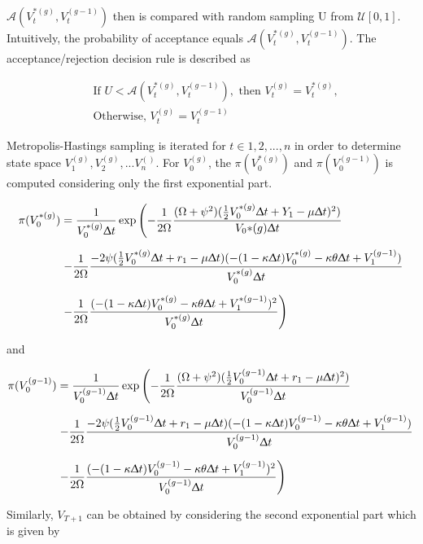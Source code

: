\documentclass[12pt,a4paper]{article}
\numberwithin{equation}{section}
\begin{document}
$\mathcal{A}(V_t^{*(g)}, V_t^{(g-1)})$ then is compared with random sampling U from $\mathcal{U}[0, 1]$. Intuitively, the probability of acceptance equals $\mathcal{A}(V_t^{*(g)}, V_t^{(g-1)})$. The acceptance/rejection decision rule is described as

\begin{align*}
&\text{If } U< \mathcal{A}(V_t^{*(g)}, V_t^{(g-1)}), \text{ then } V_t^{(g)} = V_t^{*(g)},\\
&\text{Otherwise, }  V_t^{(g)} = V_t^{(g-1)}
\end{align*} 

Metropolis-Hastings sampling is iterated for $t \in {1, 2, ..., n}$ in order to determine state space $V_1^{(g)}, V_2^{(g)}, ...V_n^{()}$. For $V_0^{(g)}$, the $\pi(V_0^{*(g)})$ and $\pi(V_0^{(g-1)})$ is computed considering only the first exponential part. 

\begin{align*}
\pi(V_0^{*(g)}) &= \frac{1}{V_0^{*(g)} \Updelta t} \exp \left( -\frac{1}{2 \Omega} \frac{(\Omega + \psi^2)(\frac{1}{2} V_0^{*(g)} \Updelta t + Y_{1} - \mu \Updelta t)^2)}{V_0{*(g)} \Updelta t} \right.\\[0.6em]
& \left. -\frac{1}{2\Omega}\frac{-2\psi (\frac{1}{2}V_0^{*(g)} \Updelta t + r_{1} - \mu \Updelta t)(-(1-\kappa\Updelta t) V_0^{*(g)} -\kappa \theta \Updelta t + V_{1}^{(g-1)})}{V_0^{*(g)} \Updelta t} \right.\\[0.6em]
& \left. -\frac{1}{2\Omega}\frac{(-(1-\kappa \Updelta t) V_0^{*(g)} -\kappa \theta \Updelta t + V_{1}^{*(g-1)})^2}{V_0^{*(g)} \Updelta t} \right)
\end{align*}

and 

\begin{align*}
\pi(V_0^{(g-1)}) &= \frac{1}{V_0^{(g-1)} \Updelta t} \exp \left( -\frac{1}{2 \Omega} \frac{(\Omega + \psi^2)(\frac{1}{2} V_0^{(g-1)} \Updelta t + r_{1} - \mu \Updelta t)^2)}{V_0^{(g-1)} \Updelta t} \right.\\[0.6em]
& \left. -\frac{1}{2\Omega}\frac{-2\psi (\frac{1}{2}V_0^{(g-1)} \Updelta t + r_{1} - \mu \Updelta t)(-(1-\kappa\Updelta t) V_0^{(g-1)} -\kappa \theta \Updelta t + V_{1}^{(g-1)})}{V_0^{(g-1)} \Updelta t} \right.\\[0.6em]
& \left. -\frac{1}{2\Omega}\frac{(-(1-\kappa \Updelta t) V_0^{(g-1)} -\kappa \theta \Updelta t + V_{1}^{(g-1)})^2}{V_0^{(g-1)} \Updelta t} \right)
\end{align*}

Similarly, $V_{T+1}$ can be obtained by considering the second exponential part which is given by
\end{document}
